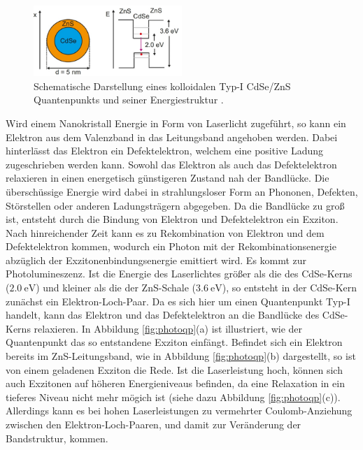\begin{figure}[hbtp]
	\centering
	\includegraphics[width=0.5\textwidth]{Abb/ZnS_CdSe.png}
	\caption{Schematische Darstellung eines kolloidalen Typ-I CdSe/ZnS Quantenpunkts
   und seiner Energiestruktur \cite{anleitung}.}
	\label{fig:ZnS_CdSe}
\end{figure}
\noindent
Wird einem Nanokristall Energie in Form von Laserlicht zugeführt, so kann ein
Elektron aus dem Valenzband in das Leitungsband angehoben werden. Dabei hinterlässt
das Elektron ein Defektelektron, welchem eine positive Ladung zugeschrieben werden kann.
Sowohl das Elektron als auch das Defektelektron relaxieren in einen energetisch
günstigeren Zustand nah der Bandlücke. Die überschüssige Energie wird dabei in
strahlungsloser Form an Phononen, Defekten, Störstellen oder anderen Ladungsträgern
abgegeben. Da die Bandlücke zu groß ist, entsteht durch die Bindung von Elektron
und Defektelektron ein Exziton. Nach hinreichender Zeit kann es zu Rekombination
von Elektron und dem Defektelektron kommen, wodurch ein Photon mit der
Rekombinationsenergie abzüglich der Exzitonenbindungsenergie emittiert wird.
Es kommt zur Photolumineszenz. Ist die Energie des Laserlichtes größer als die
des CdSe-Kerns ($\SI{2,0}{\electronvolt}$) und kleiner als die der ZnS-Schale
($\SI{3,6}{\electronvolt}$), so entsteht in der CdSe-Kern zunächst ein
Elektron-Loch-Paar. Da es sich hier um einen Quantenpunkt Typ-I handelt, kann das
Elektron und das Defektelektron an die Bandlücke des CdSe-Kerns relaxieren.
In Abbildung \ref{fig:photoqp}(a) ist illustriert, wie der Quantenpunkt das
so entstandene Exziton einfängt. Befindet sich ein Elektron bereits im ZnS-Leitungsband,
wie in Abbildung \ref{fig:photoqp}(b) dargestellt, so ist von einem geladenen
Exziton die Rede. Ist die Laserleistung hoch, können sich auch Exzitonen auf höheren
Energieniveaus befinden, da eine Relaxation in ein tieferes Niveau nicht mehr
mögich ist (siehe dazu Abbildung \ref{fig:photoqp}(c)). Allerdings kann es bei
hohen Laserleistungen zu vermehrter Coulomb-Anziehung zwischen
den Elektron-Loch-Paaren, und damit zur Veränderung der Bandstruktur, kommen.

